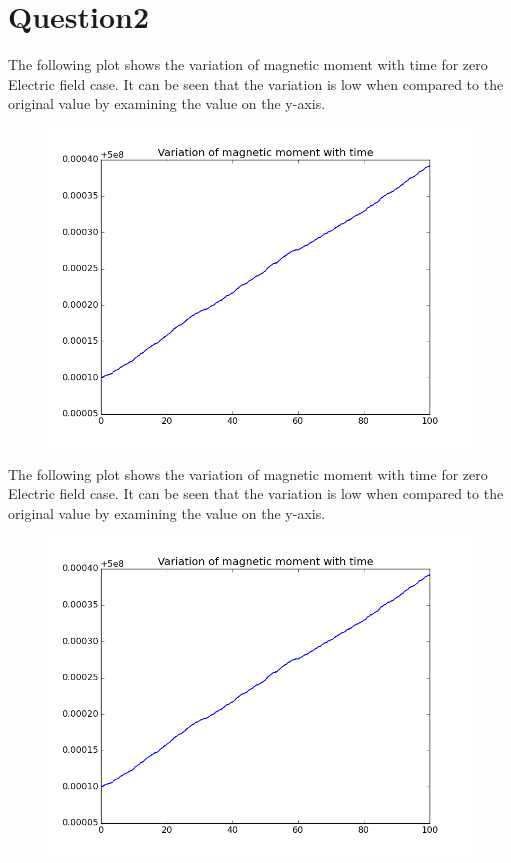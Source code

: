 \documentclass[11pt, a4paper]{article}
\begin{document}
\section{Question2}
The following plot shows the variation of magnetic moment with time for zero Electric field case. It can be seen that the variation is low when compared to the original value by examining the value on the y-axis.
\begin{figure}[H]
 \centering
 \includegraphics[width = \textwidth]{q2a1.png}
\end{figure}
The following plot shows the variation of magnetic moment with time for zero Electric field case. It can be seen that the variation is low when compared to the original value by examining the value on the y-axis.
\begin{figure}[H]
 \centering
 \includegraphics[width = \textwidth]{q2a2.png}
\end{figure}
\end{document}
